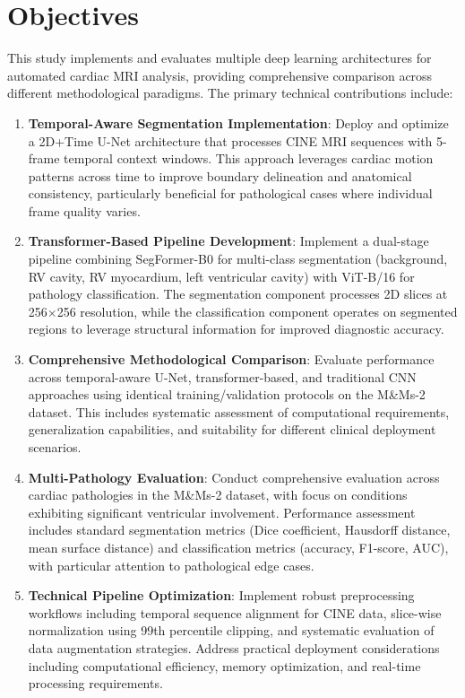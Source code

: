 \documentclass[twoside,11pt]{article}
\begin{document}
  \section{Objectives}

  This study implements and evaluates multiple deep learning architectures for automated cardiac MRI analysis, providing comprehensive comparison across different methodological paradigms. The primary technical contributions include:

   \begin{enumerate}
   \item  \textbf{Temporal-Aware Segmentation Implementation}: Deploy and optimize a 2D+Time U-Net architecture that processes CINE MRI sequences with 5-frame temporal context windows. This approach leverages cardiac motion patterns across time to improve boundary delineation and anatomical consistency, particularly beneficial for pathological cases where individual frame quality varies.
   
   \item  \textbf{Transformer-Based Pipeline Development}: Implement a dual-stage pipeline combining SegFormer-B0 for multi-class segmentation (background, RV cavity, RV myocardium, left ventricular cavity) with ViT-B/16 for pathology classification. The segmentation component processes 2D slices at 256×256 resolution, while the classification component operates on segmented regions to leverage structural information for improved diagnostic accuracy.
   
   \item  \textbf{Comprehensive Methodological Comparison}: Evaluate performance across temporal-aware U-Net, transformer-based, and traditional CNN approaches using identical training/validation protocols on the M\&Ms-2 dataset. This includes systematic assessment of computational requirements, generalization capabilities, and suitability for different clinical deployment scenarios.
   
   \item  \textbf{Multi-Pathology Evaluation}: Conduct comprehensive evaluation across cardiac pathologies in the M\&Ms-2 dataset, with focus on conditions exhibiting significant ventricular involvement. Performance assessment includes standard segmentation metrics (Dice coefficient, Hausdorff distance, mean surface distance) and classification metrics (accuracy, F1-score, AUC), with particular attention to pathological edge cases.
   
   \item  \textbf{Technical Pipeline Optimization}: Implement robust preprocessing workflows including temporal sequence alignment for CINE data, slice-wise normalization using 99th percentile clipping, and systematic evaluation of data augmentation strategies. Address practical deployment considerations including computational efficiency, memory optimization, and real-time processing requirements.
   

\end{enumerate}
\end{document}
